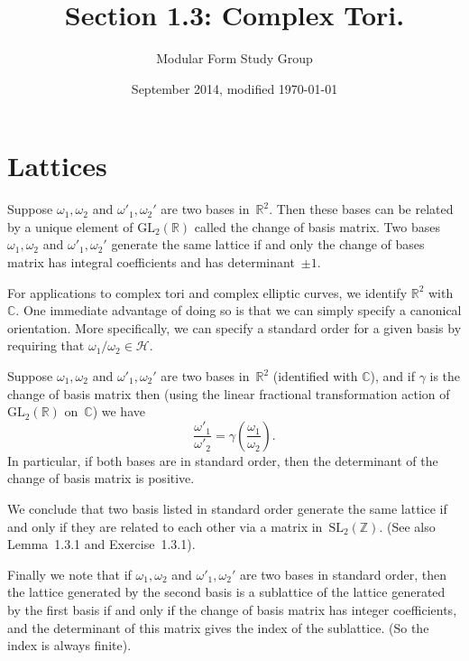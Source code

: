 \documentclass{article}
\theoremstyle{plain}
\theoremstyle{definition}
\theoremstyle{remark}
\newcommand{\Z}{\mathbb{Z}}
\newcommand{\R}{\mathbb{R}}
\newcommand{\C}{\mathbb{C}}
\newcommand{\h}{{\mathcal{H}}}
\begin{document}
 

\title{Section 1.3: Complex Tori.}

\author{Modular Form Study Group}

\date{September 2014, modified \today}

\maketitle


\section{Lattices}

Suppose $\omega_1, \omega_2$ and $\omega'_1, \omega_2'$ are two bases
in~$\R^2$. Then these bases can
be related by a unique element of  $\mathrm{GL}_2(\R)$ called the change of
basis matrix. 
Two bases $\omega_1, \omega_2$ and $\omega'_1, \omega_2'$ generate the same lattice if and only 
the change of bases matrix has integral coefficients and has determinant~$\pm 1$.

For applications to complex tori and complex elliptic curves, we identify $\R^2$ with~$\C$.
One immediate advantage of doing so is that we can simply specify a canonical orientation. More
specifically, we can specify a standard order for a given basis by requiring that
$\omega_1/\omega_2 \in \h$.

Suppose $\omega_1, \omega_2$ and $\omega'_1, \omega_2'$ are two bases
in~$\R^2$ (identified with $\C$), and if $\gamma$ is the change of basis matrix
then (using the linear fractional transformation action of $\mathrm{GL}_2(\R)$ on~$\C$)
we have
$$
\frac{\omega'_1} {\omega'_2} = \gamma \left( \frac{\omega_1} {\omega_2} \right).
$$
In particular, if both bases are in standard order, then the determinant of the change of basis matrix is positive.

We conclude that two basis listed in standard order generate the same lattice if and only if they are related to each other via a matrix in~$\mathrm{SL}_2(\Z)$. (See also Lemma~1.3.1 and Exercise~1.3.1).

Finally we note that if $\omega_1, \omega_2$ and $\omega'_1, \omega_2'$
are two bases in standard order, then the lattice generated by the second basis
is a sublattice of the lattice generated by the first basis if and only if
the change of basis matrix has integer coefficients, and the determinant of
this matrix gives the index of the sublattice. (So the index is always finite).
\end{document}
